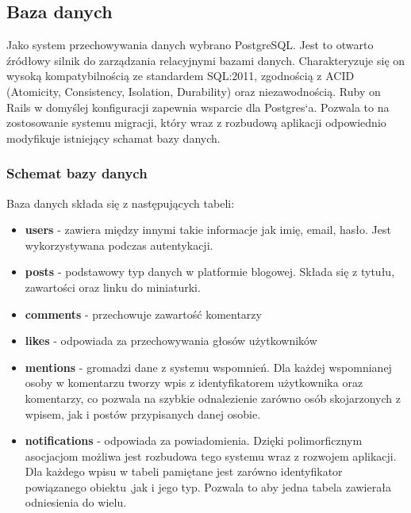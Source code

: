 \documentclass[declaration,shortabstract]{iithesis}
\begin{document}
\subsection{Baza danych}
Jako system przechowywania danych wybrano PostgreSQL. Jest to otwarto źródłowy silnik do zarządzania relacyjnymi bazami danych. Charakteryzuje się on wysoką kompatybilnością ze standardem SQL:2011, zgodnością z ACID (Atomicity, Consistency, Isolation, Durability) oraz niezawodnością. Ruby on Rails w domyślej konfiguracji zapewnia wsparcie dla Postgres`a. Pozwala to na zostosowanie systemu migracji, który wraz z rozbudową aplikacji odpowiednio modyfikuje istniejący schamat bazy danych.

\subsubsection{Schemat bazy danych}
Baza danych składa się z następujących tabeli: 
\begin{itemize}
    \item \textbf{users} - zawiera między innymi takie informacje jak imię, email, hasło. Jest wykorzystywana podczas autentykacji.
    \item \textbf{posts} - podstawowy typ danych w platformie blogowej. Składa się z tytułu, zawartości oraz linku do miniaturki.
    \item \textbf{comments} - przechowuje zawartość komentarzy
    \item \textbf{likes} - odpowiada za przechowywania głosów użytkowników
    \item \textbf{mentions} - gromadzi dane z systemu wspomnień. Dla każdej wspomnianej osoby w komentarzu tworzy wpis z identyfikatorem użytkownika oraz komentarzy, co pozwala na szybkie odnalezienie zarówno osób skojarzonych z wpisem, jak i postów przypisanych danej osobie.
    \item \textbf{notifications} - odpowiada za powiadomienia. Dzięki polimorficznym asocjacjom możliwa jest rozbudowa tego systemu wraz z rozwojem aplikacji. Dla każdego wpisu w tabeli pamiętane jest zarówno identyfikator powiązanego obiektu ,jak i jego typ. Pozwala to aby jedna tabela zawierała odniesienia do wielu.
\end{itemize}
\end{document}
